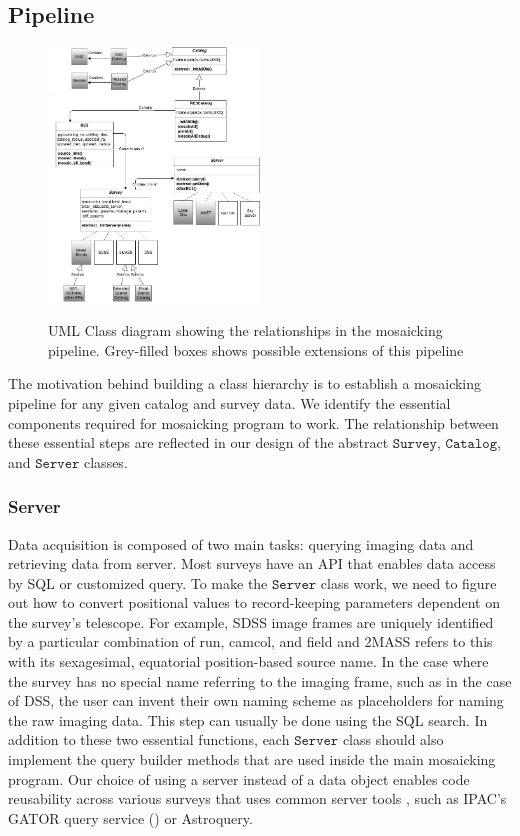 \documentclass[5p]{elsarticle}
\begin{document}
	\subsection{Pipeline}
	\begin{figure}[h]
		\includegraphics[width=0.5\textwidth]{figures/hierarchy}
		\label{fig:hierarchy}
		\caption{UML Class diagram showing the relationships in the mosaicking pipeline. Grey-filled boxes shows possible extensions of this pipeline}
	\end{figure}
 	The motivation behind building a class hierarchy is to establish a mosaicking pipeline for any given catalog and survey data. We identify the essential components required for mosaicking program to work. The relationship between these essential steps are reflected in our design of the abstract $\texttt{Survey}$, $\texttt{Catalog}$, and $\texttt{Server}$ classes. 
 		\subsubsection{Server}
		Data acquisition is composed of two main tasks: querying imaging data and retrieving data from server. Most surveys have an API that enables data access by SQL or customized query. To make the $\texttt{Server}$ class work, we need to figure out how to convert positional values to record-keeping parameters dependent on the survey's telescope. For example, SDSS image frames are uniquely identified by a particular combination of  run, camcol, and field and 2MASS refers to this with its sexagesimal, equatorial position-based source name. In the case where the survey has no special name referring to the imaging frame, such as in the case of DSS, the user can invent their own naming scheme as placeholders for naming the raw imaging data. This step can usually be done using the SQL search. In addition to these two essential functions, each $\texttt{Server}$ class should also implement the query builder methods that are used inside the main mosaicking program.  Our choice of using a server instead of a data object enables code reusability across various surveys that uses common server tools , such as IPAC's GATOR query service (\citet{irsa}) or  Astroquery.
\end{document}
